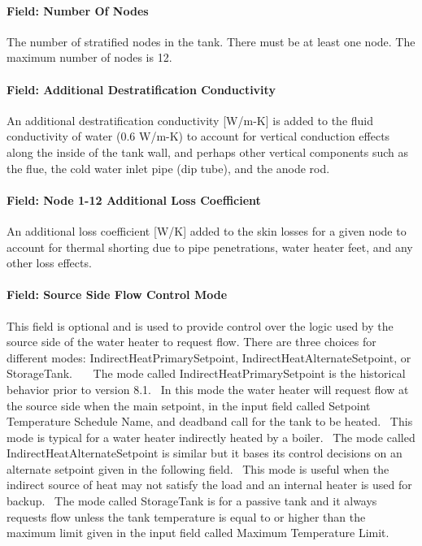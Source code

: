 \paragraph{Field: Number Of Nodes}\label{field-number-of-nodes-000}

The number of stratified nodes in the tank. There must be at least one node. The maximum number of nodes is 12.

\paragraph{Field: Additional Destratification Conductivity}\label{field-additional-destratification-conductivity-000}

An additional destratification conductivity {[}W/m-K{]} is added to the fluid conductivity of water (0.6 W/m-K) to account for vertical conduction effects along the inside of the tank wall, and perhaps other vertical components such as the flue, the cold water inlet pipe (dip tube), and the anode rod.

\paragraph{Field: Node 1-12 Additional Loss Coefficient}\label{field-node-1-12-additional-loss-coefficient}

An additional loss coefficient {[}W/K{]} added to the skin losses for a given node to account for thermal shorting due to pipe penetrations, water heater feet, and any other loss effects.

\paragraph{Field: Source Side Flow Control Mode}\label{field-source-side-flow-control-mode-1}

This field is optional and is used to provide control over the logic used by the source side of the water heater to request flow. There are three choices for different modes: IndirectHeatPrimarySetpoint, IndirectHeatAlternateSetpoint, or StorageTank.~~~ The mode called IndirectHeatPrimarySetpoint is the historical behavior prior to version 8.1.~ In this mode the water heater will request flow at the source side when the main setpoint, in the input field called Setpoint Temperature Schedule Name, and deadband call for the tank to be heated.~ This mode is typical for a water heater indirectly heated by a boiler.~ The mode called IndirectHeatAlternateSetpoint is similar but it bases its control decisions on an alternate setpoint given in the following field.~ This mode is useful when the indirect source of heat may not satisfy the load and an internal heater is used for backup.~ The mode called StorageTank is for a passive tank and it always requests flow unless the tank temperature is equal to or higher than the maximum limit given in the input field called Maximum Temperature Limit.


